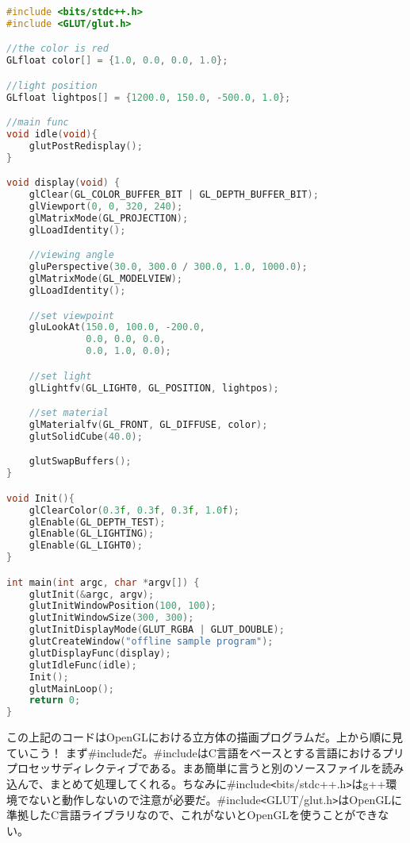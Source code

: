 \documentclass[12pt,a4paper]{jsarticle}
\begin{document}
\begin{lstlisting}[language=C++]
#include <bits/stdc++.h>
#include <GLUT/glut.h>

//the color is red
GLfloat color[] = {1.0, 0.0, 0.0, 1.0};

//light position
GLfloat lightpos[] = {1200.0, 150.0, -500.0, 1.0};

//main func
void idle(void){
    glutPostRedisplay();
}

void display(void) {
    glClear(GL_COLOR_BUFFER_BIT | GL_DEPTH_BUFFER_BIT);
    glViewport(0, 0, 320, 240); 
    glMatrixMode(GL_PROJECTION);
    glLoadIdentity();

    //viewing angle
    gluPerspective(30.0, 300.0 / 300.0, 1.0, 1000.0);
    glMatrixMode(GL_MODELVIEW);
    glLoadIdentity();

    //set viewpoint
    gluLookAt(150.0, 100.0, -200.0,
              0.0, 0.0, 0.0,
              0.0, 1.0, 0.0);

    //set light
    glLightfv(GL_LIGHT0, GL_POSITION, lightpos);

    //set material
    glMaterialfv(GL_FRONT, GL_DIFFUSE, color);
    glutSolidCube(40.0);

    glutSwapBuffers();
}

void Init(){
    glClearColor(0.3f, 0.3f, 0.3f, 1.0f);
    glEnable(GL_DEPTH_TEST);
    glEnable(GL_LIGHTING);
    glEnable(GL_LIGHT0);
}

int main(int argc, char *argv[]) {
    glutInit(&argc, argv);
    glutInitWindowPosition(100, 100);
    glutInitWindowSize(300, 300);
    glutInitDisplayMode(GLUT_RGBA | GLUT_DOUBLE);
    glutCreateWindow("offline sample program");
    glutDisplayFunc(display);
    glutIdleFunc(idle);
    Init();
    glutMainLoop();
    return 0;
}
\end{lstlisting}

この上記のコードはOpenGLにおける立方体の描画プログラムだ。上から順に見ていこう！
まず\#includeだ。\#includeはC言語をベースとする言語におけるプリプロセッサディレクティブである。まあ簡単に言うと別のソースファイルを読み込んで、まとめて処理してくれる。ちなみに\#include\verb|<|bits/stdc++.h\verb|>|はg++環境でないと動作しないので注意が必要だ。\#include\verb|<|GLUT/glut.h\verb|>|はOpenGLに準拠したC言語ライブラリなので、これがないとOpenGLを使うことができない。
\end{document}
